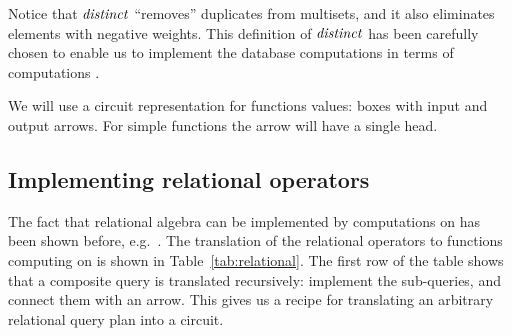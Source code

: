 Notice that $\mathit{distinct}$ ``removes'' duplicates from multisets, and it also eliminates
elements with negative weights.
This definition of $\mathit{distinct}$ has been carefully
chosen to enable us to implement the database computations
in terms of computations \zrs.

%
%

We will use a circuit representation for functions values: boxes with
input and output arrows.  For simple functions the arrow will have a
single head.

\subsection{Implementing relational operators}\label{sec:relational-operators}

The fact that relational algebra can be implemented by computations on
\zrs has been shown before, e.g.~\cite{green-pods07}.  The translation
of the relational operators to functions computing on \zrs is shown in
Table~\ref{tab:relational}.  The first row of the table shows that a
composite query is translated recursively: implement the sub-queries,
and connect them with an arrow.  This gives us a recipe for
translating an arbitrary relational query plan into a circuit.

